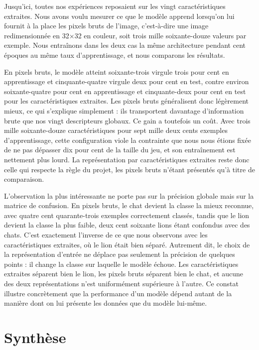 \documentclass[11pt,a4paper]{report}
\begin{document}
Jusqu'ici, toutes nos expériences reposaient sur les vingt
caractéristiques extraites. Nous avons voulu mesurer ce que le modèle
apprend lorsqu'on lui fournit à la place les pixels bruts de l'image,
c'est-à-dire une image redimensionnée en 32×32 en couleur, soit trois
mille soixante-douze valeurs par exemple. Nous entraînons dans les deux
cas la même architecture pendant cent époques au même taux
d'apprentissage, et nous comparons les résultats.

En pixels bruts, le modèle atteint soixante-trois virgule trois pour
cent en apprentissage et cinquante-quatre virgule deux pour cent en
test, contre environ soixante-quatre pour cent en apprentissage et
cinquante-deux pour cent en test pour les caractéristiques extraites.
Les pixels bruts généralisent donc légèrement mieux, ce qui s'explique
simplement : ils transportent davantage d'information brute que nos
vingt descripteurs globaux. Ce gain a toutefois un coût. Avec trois
mille soixante-douze caractéristiques pour sept mille deux cents
exemples d'apprentissage, cette configuration viole la contrainte que
nous nous étions fixée de ne pas dépasser dix pour cent de la taille du
jeu, et son entraînement est nettement plus lourd. La représentation par
caractéristiques extraites reste donc celle qui respecte la règle du
projet, les pixels bruts n'étant présentés qu'à titre de comparaison.

L'observation la plus intéressante ne porte pas sur la précision globale
mais sur la matrice de confusion. En pixels bruts, le chat devient la
classe la mieux reconnue, avec quatre cent quarante-trois exemples
correctement classés, tandis que le lion devient la classe la plus
faible, deux cent soixante lions étant confondus avec des chats. C'est
exactement l'inverse de ce que nous observons avec les caractéristiques
extraites, où le lion était bien séparé. Autrement dit, le choix de la
représentation d'entrée ne déplace pas seulement la précision de
quelques points : il change la classe sur laquelle le modèle échoue. Les
caractéristiques extraites séparent bien le lion, les pixels bruts
séparent bien le chat, et aucune des deux représentations n'est
uniformément supérieure à l'autre. Ce constat illustre concrètement que
la performance d'un modèle dépend autant de la manière dont on lui
présente les données que du modèle lui-même.

\hypertarget{synthuxe8se-1}{%
\section{Synthèse}\label{synthuxe8se-1}}
\end{document}
